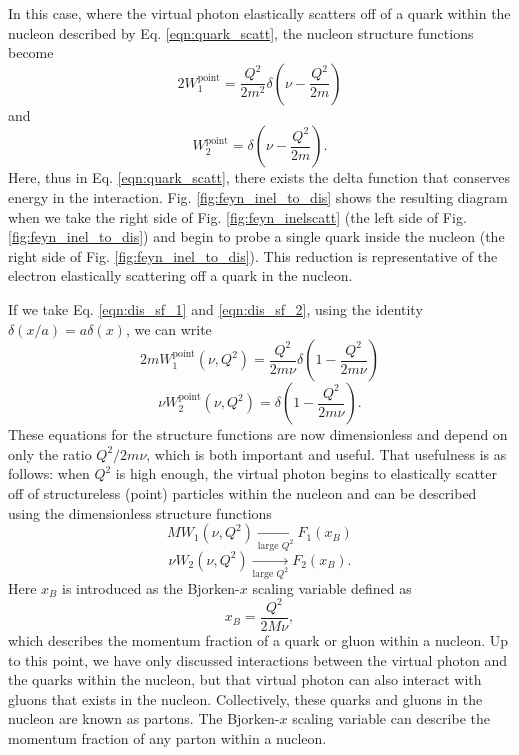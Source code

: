 In this case, where the virtual photon elastically scatters off of a quark within the nucleon described by Eq. \ref{eqn:quark_scatt}, the nucleon structure functions become
\begin{equation}
\label{eqn:dis_sf_1}
2W_1^{\mathrm{point}} = \frac{Q^2}{2m^2} \delta \left( \nu - \frac{Q^2}{2m} \right)
\end{equation}
and
\begin{equation}
\label{eqn:dis_sf_2}
W_2^{\mathrm{point}} = \delta \left( \nu - \frac{Q^2}{2m} \right).
\end{equation}
Here, thus in Eq. \ref{eqn:quark_scatt}, there exists the delta function that conserves energy in the interaction. Fig. \ref{fig:feyn_inel_to_dis} shows the resulting diagram when we take the right side of Fig. \ref{fig:feyn_inelscatt} (the left side of Fig. \ref{fig:feyn_inel_to_dis}) and begin to probe a single quark inside the nucleon (the right side of Fig. \ref{fig:feyn_inel_to_dis}). This reduction is representative of the electron elastically scattering off a quark in the nucleon.

If we take Eq. \ref{eqn:dis_sf_1} and \ref{eqn:dis_sf_2}, using the identity $\delta(x/a) = a\delta(x)$, we can write
\begin{equation}
\nonumber
2mW_1^{\mathrm{point}}(\nu,Q^2) = \frac{Q^2}{2m\nu} \delta \left( 1- \frac{Q^2}{2m\nu} \right)
\end{equation}
\begin{equation}
\nu W_2^{\mathrm{point}}(\nu,Q^2) = \delta \left( 1- \frac{Q^2}{2m\nu} \right).
\end{equation}
These equations for the structure functions are now dimensionless and depend on only the ratio $Q^2/2m\nu$, which is both important and useful. That usefulness is as follows: when $Q^2$ is high enough, the virtual photon begins to elastically scatter off of structureless (point) particles  within the nucleon and can be described using the dimensionless structure functions
\begin{equation}
\nonumber
MW_1(\nu,Q^2) \xrightarrow[\text{large $Q^2$}]{} F_1(x_B)
\end{equation}
\begin{equation}
\nu W_2(\nu,Q^2) \xrightarrow[\text{large $Q^2$}]{} F_2(x_B).
\end{equation}
Here $x_B$ is introduced as the Bjorken-$x$ scaling variable defined as
\begin{equation}
x_B = \frac{Q^2}{2M\nu},
\end{equation}
which describes the momentum fraction of a quark or gluon within a nucleon. Up to this point, we have only discussed interactions between the virtual photon and the quarks within the nucleon, but that virtual photon can also interact with gluons that exists in the nucleon. Collectively, these quarks and gluons in the nucleon are known as partons. The Bjorken-$x$ scaling variable can describe the momentum fraction of any parton within a nucleon.

